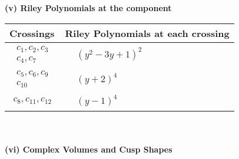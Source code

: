 \documentclass[1p]{elsarticle_modified}
\theoremstyle{definition}
\begin{document}
\newpage\renewcommand{\arraystretch}{1}
\flushleft \textbf{(v) Riley Polynomials at the component}\newline \\
\begin{tabular}{m{50pt}|m{274pt}}
Crossings & \hspace{64pt}Riley Polynomials at each crossing \\
\hline $$\begin{aligned}c_{1},c_{2},c_{3}\\c_{4},c_{7}\end{aligned}$$&$\begin{aligned}
&(y^2-3 y+1)^2
\end{aligned}$\\
\hline $$\begin{aligned}c_{5},c_{6},c_{9}\\c_{10}\end{aligned}$$&$\begin{aligned}
&(y+2)^4
\end{aligned}$\\
\hline $$\begin{aligned}c_{8},c_{11},c_{12}\end{aligned}$$&$\begin{aligned}
&(y-1)^4
\end{aligned}$\\
\hline
\end{tabular}\\~\\
\newpage\flushleft \textbf{(vi) Complex Volumes and Cusp Shapes}
\end{document}
